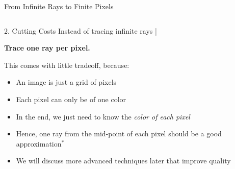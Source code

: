 \begin{frame}{From Infinite Rays to Finite Pixels}
    \begin{columns}
        \begin{column}{0.6\textwidth}
            \begin{raybox}{2. Cutting Costs}
                Instead of tracing infinite rays |

                \vspace{0.1cm}
                \textbf{Trace one ray per pixel.}
            \end{raybox}
            \vspace{0.3cm}
            This comes with little tradeoff, because:
            \begin{itemize}
                \small
                \item<2-> An image is just a grid of pixels
                \item<3-> Each pixel can only be of one color
                \item<4-> In the end, we just need to know the \emph{color of each pixel}
                \item<5-> Hence, one ray from the mid-point of each pixel should be a good approximation$^*$ \\
            \end{itemize}
            \vspace{0.3cm}
            \begin{itemize}
                \footnotesize
                \item<5->[$^*$] We will discuss more advanced techniques later that improve quality
            \end{itemize}
        \end{column}
        \begin{column}{0.4\textwidth}
            \centering
            \pause
\end{column}
\end{columns}
\end{frame}
